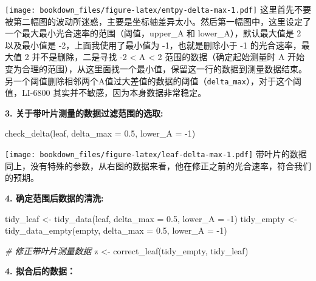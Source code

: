 \documentclass[
]{krantz}
\makeatletter
\newenvironment{Shaded}{\begin{snugshade}}{\end{snugshade}}
\newcommand{\AttributeTok}[1]{\textcolor[rgb]{0.77,0.63,0.00}{#1}}
\newcommand{\CommentTok}[1]{\textcolor[rgb]{0.56,0.35,0.01}{\textit{#1}}}
\newcommand{\DecValTok}[1]{\textcolor[rgb]{0.00,0.00,0.81}{#1}}
\newcommand{\FloatTok}[1]{\textcolor[rgb]{0.00,0.00,0.81}{#1}}
\newcommand{\FunctionTok}[1]{\textcolor[rgb]{0.00,0.00,0.00}{#1}}
\newcommand{\NormalTok}[1]{#1}
\newcommand{\OtherTok}[1]{\textcolor[rgb]{0.56,0.35,0.01}{#1}}
\newcommand{\SpecialCharTok}[1]{\textcolor[rgb]{0.00,0.00,0.00}{#1}}
\newenvironment{kframe}{%
\medskip{}
\setlength{\fboxsep}{.8em}
 \def\at@end@of@kframe{}%
 \ifinner\ifhmode%
  \def\at@end@of@kframe{\end{minipage}}%
  \begin{minipage}{\columnwidth}%
 \fi\fi%
 \def\FrameCommand##1{\hskip\@totalleftmargin \hskip-\fboxsep
 \colorbox{shadecolor}{##1}\hskip-\fboxsep
     \hskip-\linewidth \hskip-\@totalleftmargin \hskip\columnwidth}%
 \MakeFramed {\advance\hsize-\width
   \@totalleftmargin\z@ \linewidth\hsize
   \@setminipage}}%
 {\par\unskip\endMakeFramed%
 \at@end@of@kframe}
\renewenvironment{Shaded}{\begin{kframe}}{\end{kframe}}
\makeatother
\begin{document}
\texttt{[image: bookdown\_files/figure-latex/emtpy-delta-max-1.pdf]}
这里首先不要被第二幅图的波动所迷惑，主要是坐标轴差异太小。然后第一幅图中，这里设定了一个最大最小光合速率的范围（阈值，upper\_A 和 lower\_A），默认最大值是 2 以及最小值是 -2，上面我使用了最小值为 -1，也就是删除小于 -1 的光合速率，最大值 2 并不是删除，二是寻找 -2 \textless{} A \textless{} 2 范围的数据（确定起始测量时 A 开始变为合理的范围），从这里面找一个最小值，保留这一行的数据到测量数据结束。 另一个阈值删除相邻两个A值过大差值的数据的阈值（\texttt{delta\_max}），对于这个阈值，LI-6800 其实并不敏感，因为本身数据非常稳定。

\textbf{3. 关于带叶片测量的数据过滤范围的选取:}

\begin{Shaded}
\begin{Highlighting}[]
\FunctionTok{check\_delta}\NormalTok{(leaf, }\AttributeTok{delta\_max =} \FloatTok{0.5}\NormalTok{, }\AttributeTok{lower\_A =} \SpecialCharTok{{-}}\DecValTok{1}\NormalTok{)}
\end{Highlighting}
\end{Shaded}

\texttt{[image: bookdown\_files/figure-latex/leaf-delta-max-1.pdf]}
带叶片的数据同上，没有特殊的参数，从右图的数据来看，他在修正之前的光合速率，符合我们的预期。

\textbf{4. 确定范围后数据的清洗:}

\begin{Shaded}
\begin{Highlighting}[]
\NormalTok{tidy\_leaf }\OtherTok{\textless{}{-}} \FunctionTok{tidy\_data}\NormalTok{(leaf, }\AttributeTok{delta\_max =} \FloatTok{0.5}\NormalTok{, }\AttributeTok{lower\_A =} \SpecialCharTok{{-}}\DecValTok{1}\NormalTok{)}
\NormalTok{tidy\_empty }\OtherTok{\textless{}{-}} \FunctionTok{tidy\_data\_empty}\NormalTok{(empty, }\AttributeTok{delta\_max =} \FloatTok{0.5}\NormalTok{, }\AttributeTok{lower\_A =} \SpecialCharTok{{-}}\DecValTok{1}\NormalTok{)}

\CommentTok{\# 修正带叶片测量数据}
\NormalTok{z }\OtherTok{\textless{}{-}} \FunctionTok{correct\_leaf}\NormalTok{(tidy\_empty, tidy\_leaf)}
\end{Highlighting}
\end{Shaded}

\textbf{4. 拟合后的数据：}
\end{document}
